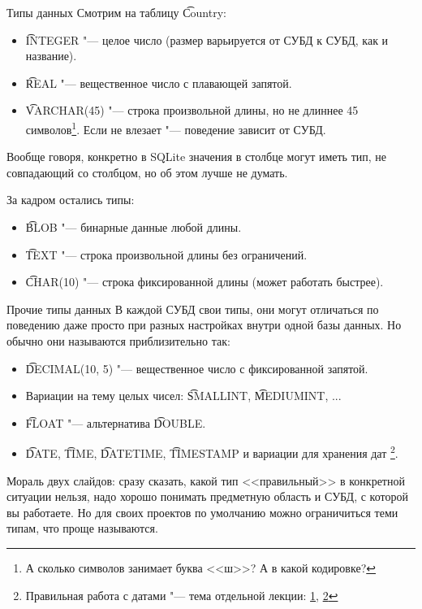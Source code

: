 \begin{frame}{Типы данных}
	Смотрим на таблицу \t{Country}:
	\begin{itemize}
		\item \t{INTEGER} "--- целое число (размер варьируется от СУБД к СУБД, как и название).
		\item \t{REAL} "--- вещественное число с плавающей запятой.
		\item \t{VARCHAR(45)} "--- строка произвольной длины, но не длиннее 45 символов\footnote{А сколько символов занимает буква <<ш>>? А в какой кодировке?}.
			Если не влезает "--- поведение зависит от СУБД.
	\end{itemize}
	Вообще говоря, конкретно в SQLite значения в столбце могут иметь тип, не совпадающий со столбцом, но об этом лучше не думать.

	За кадром остались типы:
	\begin{itemize}
		\item \t{BLOB} "--- бинарные данные любой длины.
		\item \t{TEXT} "--- строка произвольной длины без ограничений.
		\item \t{CHAR(10)} "--- строка фиксированной длины (может работать быстрее).
	\end{itemize}
\end{frame}

\begin{frame}{Прочие типы данных}
	В каждой СУБД свои типы, они могут отличаться по поведению даже просто при разных настройках внутри одной базы данных.
	Но обычно они называются приблизительно так:

	\begin{itemize}
		\item \t{DECIMAL(10, 5)} "--- вещественное число с фиксированной запятой.
		\item Вариации на тему целых чисел: \t{SMALLINT}, \t{MEDIUMINT}, ...
		\item \t{FLOAT} "--- альтернатива \t{DOUBLE}.
		\item \t{DATE}, \t{TIME}, \t{DATETIME}, \t{TIMESTAMP} и вариации для хранения дат
			\footnote{Правильная работа с датами "--- тема отдельной лекции: \href{https://habrahabr.ru/post/146109/}{1}, \href{https://habrahabr.ru/company/mailru/blog/242645/}{2}}.
	\end{itemize}

	Мораль двух слайдов: сразу сказать, какой тип <<правильный>> в конкретной ситуации нельзя,
	надо хорошо понимать предметную область и СУБД, с которой вы работаете.
	Но для своих проектов по умолчанию можно ограничиться теми типам, что проще называются.
\end{frame}


